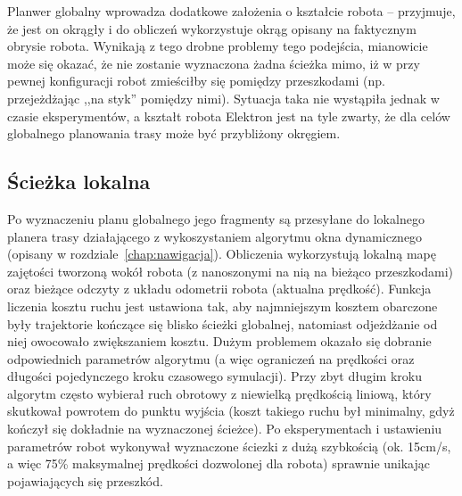 Planwer globalny wprowadza dodatkowe założenia o kształcie robota -- przyjmuje, że
jest on okrągły i do obliczeń wykorzystuje okrąg opisany na faktycznym obrysie robota.
Wynikają z tego drobne problemy tego podejścia, mianowicie może się okazać, że nie
zostanie wyznaczona żadna ścieżka mimo, iż w przy pewnej konfiguracji robot zmieściłby
się pomiędzy przeszkodami (np. przejeżdżając ,,na styk'' pomiędzy nimi). Sytuacja
taka nie wystąpiła jednak w czasie eksperymentów, a kształt robota Elektron jest
na tyle zwarty, że dla celów globalnego planowania trasy może być przybliżony okręgiem.

\subsection{Ścieżka lokalna}

Po wyznaczeniu planu globalnego jego fragmenty są przesyłane do lokalnego planera
trasy działającego z wykoszystaniem algorytmu okna dynamicznego (opisany w
rozdziale~\ref{chap:nawigacja}). Obliczenia wykorzystują lokalną mapę zajętości
tworzoną wokół robota (z nanoszonymi na nią na bieżąco przeszkodami) oraz
bieżące odczyty z układu odometrii robota (aktualna prędkość).
Funkcja liczenia kosztu ruchu jest ustawiona tak,
aby najmniejszym kosztem obarczone były trajektorie kończące się blisko ścieżki globalnej,
natomiast odjeżdżanie od niej owocowało zwiększaniem kosztu. Dużym problemem okazało
się dobranie odpowiednich parametrów algorytmu (a więc ograniczeń na prędkości
oraz długości pojedynczego kroku czasowego symulacji). Przy zbyt długim kroku
algorytm często wybierał ruch obrotowy z niewielką prędkością liniową, który skutkował
powrotem do punktu wyjścia (koszt takiego ruchu był minimalny, gdyż kończył się dokładnie
na wyznaczonej ścieżce). Po eksperymentach i ustawieniu parametrów robot wykonywał
wyznaczone ściezki z dużą szybkością (ok. 15cm/s, a więc 75\% maksymalnej prędkości
dozwolonej dla robota) sprawnie unikając pojawiających się przeszkód.
